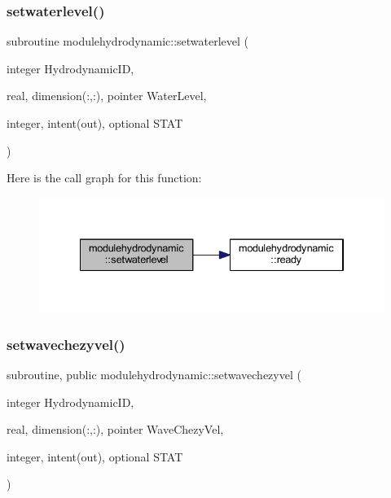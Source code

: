 \subsubsection{\texorpdfstring{setwaterlevel()}{setwaterlevel()}}
{\footnotesize\ttfamily subroutine modulehydrodynamic\+::setwaterlevel (\begin{DoxyParamCaption}\item[{integer}]{Hydrodynamic\+ID,  }\item[{real, dimension(\+:,\+:), pointer}]{Water\+Level,  }\item[{integer, intent(out), optional}]{S\+T\+AT }\end{DoxyParamCaption})\hspace{0.3cm}{\ttfamily [private]}}

Here is the call graph for this function\+:\nopagebreak
\begin{figure}[H]
\begin{center}
\leavevmode
\includegraphics[width=334pt]{namespacemodulehydrodynamic_ac429c4fc2329d56d285f5389d5d57e55_cgraph}
\end{center}
\end{figure}
\mbox{\label{namespacemodulehydrodynamic_ad7a33c322002783aeb2b7b50ed690a4b}} 
\subsubsection{\texorpdfstring{setwavechezyvel()}{setwavechezyvel()}}
{\footnotesize\ttfamily subroutine, public modulehydrodynamic\+::setwavechezyvel (\begin{DoxyParamCaption}\item[{integer}]{Hydrodynamic\+ID,  }\item[{real, dimension(\+:,\+:), pointer}]{Wave\+Chezy\+Vel,  }\item[{integer, intent(out), optional}]{S\+T\+AT }\end{DoxyParamCaption})}

